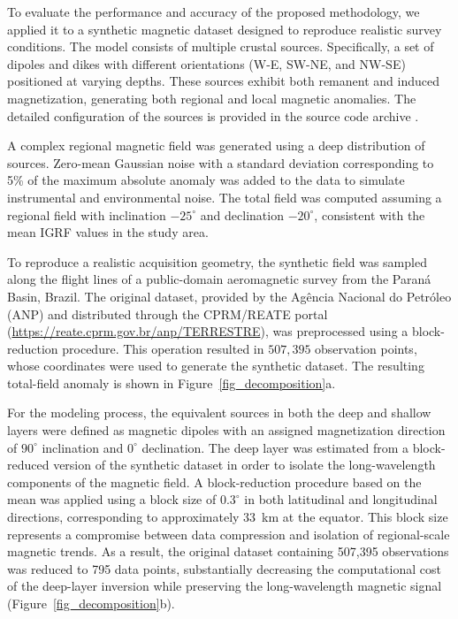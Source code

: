 To evaluate the performance and accuracy of the proposed methodology, we applied
it to a synthetic magnetic dataset designed to reproduce realistic survey
conditions. The model consists of multiple crustal sources. Specifically, a set
of dipoles and dikes with different orientations (W-E, SW-NE, and NW-SE)
positioned at varying depths. These sources exhibit both remanent and induced
magnetization, generating both regional and local magnetic anomalies. The
detailed configuration of the sources is provided in the source code archive
\citep{archive}.

A complex regional magnetic field was generated using a deep distribution of
sources. Zero-mean Gaussian noise with a standard deviation corresponding to
5\% of the maximum absolute anomaly was added to the data to simulate
instrumental and environmental noise. The total field was computed assuming a
regional field with inclination $-25^{\circ}$ and declination $-20^{\circ}$,
consistent with the mean IGRF values in the study area.

To reproduce a realistic acquisition geometry, the synthetic field was
sampled along the flight lines of a public-domain aeromagnetic survey from the
Paraná Basin, Brazil. The original dataset, provided by the Agência Nacional
do Petróleo (ANP) and distributed through the CPRM/REATE portal
(\url{https://reate.cprm.gov.br/anp/TERRESTRE}), was preprocessed using a
block-reduction procedure. This operation resulted in $507,395$ observation
points, whose coordinates were used to generate the synthetic dataset. The
resulting total-field anomaly is shown in
Figure~\ref{fig_decomposition}a.

For the modeling process, the equivalent sources in both the deep and shallow
layers were defined as magnetic dipoles with an assigned magnetization direction
of $90^{\circ}$ inclination and $0^{\circ}$ declination.
The deep layer was estimated from a block-reduced version of the synthetic
dataset in order to isolate the long-wavelength components of the magnetic
field. A block-reduction procedure based on the mean was applied using a
block size of $0.3^{\circ}$ in both latitudinal and longitudinal directions,
corresponding to approximately 33~km at the equator. This block size
represents a compromise between data compression and isolation of
regional-scale magnetic trends.
As a result, the original dataset containing 507,395 observations was reduced
to 795 data points, substantially decreasing the computational cost of the
deep-layer inversion while preserving the long-wavelength magnetic signal
(Figure~\ref{fig_decomposition}b).

